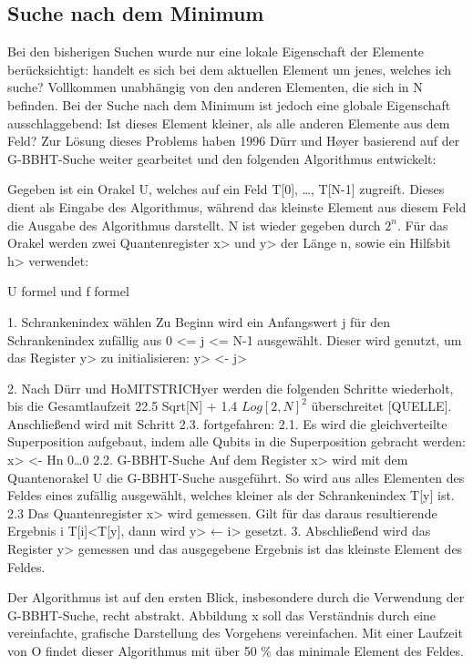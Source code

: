 \subsection{Suche nach dem Minimum}
Bei den bisherigen Suchen wurde nur eine lokale Eigenschaft der Elemente berücksichtigt: handelt es sich bei dem aktuellen Element um jenes, welches ich suche? Vollkommen unabhängig von den anderen Elementen, die sich in N befinden. Bei der Suche nach dem Minimum ist jedoch eine globale Eigenschaft ausschlaggebend: Ist dieses Element kleiner, als alle anderen Elemente aus dem Feld? 
Zur Lösung dieses Problems haben 1996 Dürr und Høyer basierend auf der G-BBHT-Suche weiter gearbeitet und den folgenden Algorithmus entwickelt: 

Gegeben ist ein Orakel U, welches auf ein Feld T[0], …, T[N-1] zugreift. Dieses dient als Eingabe des Algorithmus, während das kleinste Element aus diesem Feld die Ausgabe des Algorithmus darstellt. N ist wieder gegeben durch $2^n$. Für das Orakel werden zwei Quantenregister x> und y> der Länge n, sowie ein Hilfsbit h> verwendet:

U formel und f formel

1. Schrankenindex wählen
Zu Beginn wird ein Anfangswert j für den Schrankenindex zufällig aus 0 <= j <= N-1 ausgewählt. Dieser wird genutzt, um das Register y> zu initialisieren: y> <- j>

2. Nach Dürr und HoMITSTRICHyer werden die folgenden Schritte wiederholt, bis die Gesamtlaufzeit 22.5 Sqrt[N] + 1.4 $Log[2,N]^2$ überschreitet [QUELLE]. Anschließend wird mit Schritt 2.3. fortgefahren:
2.1. Es wird die gleichverteilte Superposition aufgebaut, indem alle Qubits in die Superposition gebracht werden:
x> <- Hn 0…0  
2.2. G-BBHT-Suche
Auf dem Register x> wird mit dem Quantenorakel U die G-BBHT-Suche ausgeführt. So wird aus alles Elementen des Feldes eines zufällig ausgewählt, welches kleiner als der Schrankenindex T[y] ist.
2.3 Das Quantenregister x> wird gemessen. Gilt für das daraus resultierende Ergebnis i T[i]<T[y], dann wird y> ← i>  gesetzt.
3. Abschließend wird das Register y> gemessen und das ausgegebene Ergebnis ist das kleinste Element des Feldes.

Der Algorithmus ist auf den ersten Blick, insbesondere durch die Verwendung der G-BBHT-Suche, recht abstrakt. Abbildung x soll das Verständnis  durch eine vereinfachte, grafische Darstellung des Vorgehens vereinfachen. Mit einer Laufzeit von O findet dieser Algorithmus mit über 50 \% das minimale Element des Feldes.
